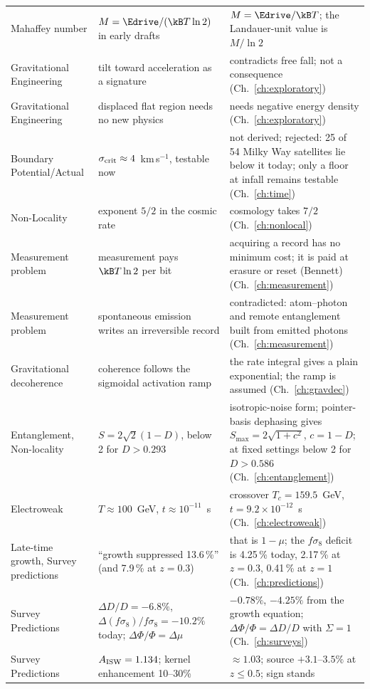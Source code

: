 {\begin{longtable}{@{}p{}p{}p{}@{}}
Mahaffey number & $M=\Edrive/(\kB T\ln2)$ in early drafts & $M=\Edrive/\kB T$; the Landauer-unit value is $M/\ln2$ \\
Gravitational Engineering & tilt toward acceleration as a signature & contradicts free fall; not a consequence (Ch.~\ref{ch:exploratory}) \\
Gravitational Engineering & displaced flat region needs no new physics & needs negative energy density (Ch.~\ref{ch:exploratory}) \\
Boundary Potential/Actual & $\sigma_{\rm crit}\approx4$~km\,s$^{-1}$, testable now & not derived; rejected: 25 of 54 Milky Way satellites lie below it today; only a floor at infall remains testable (Ch.~\ref{ch:time}) \\
Non-Locality & exponent $5/2$ in the cosmic rate & cosmology takes $7/2$ (Ch.~\ref{ch:nonlocal}) \\
Measurement problem & measurement pays $\kB T\ln2$ per bit & acquiring a record has no minimum cost; it is paid at erasure or reset (Bennett) (Ch.~\ref{ch:measurement}) \\
Measurement problem & spontaneous emission writes an irreversible record & contradicted: atom--photon and remote entanglement built from emitted photons (Ch.~\ref{ch:measurement}) \\
Gravitational decoherence & coherence follows the sigmoidal activation ramp & the rate integral gives a plain exponential; the ramp is assumed (Ch.~\ref{ch:gravdec}) \\
Entanglement, Non-locality & $S=2\sqrt2(1-D)$, below 2 for $D>0.293$ & isotropic-noise form; pointer-basis dephasing gives $S_{\max}=2\sqrt{1+c^2}$, $c=1-D$; at fixed settings below 2 for $D>0.586$ (Ch.~\ref{ch:entanglement}) \\
Electroweak & $T\approx100$~GeV, $t\approx10^{-11}$~s & crossover $T_c=159.5$~GeV, $t=9.2\times10^{-12}$~s (Ch.~\ref{ch:electroweak}) \\
Late-time growth, Survey predictions & ``growth suppressed 13.6\,\%'' (and 7.9\,\% at $z=0.3$) & that is $1-\mu$; the $f\sigma_8$ deficit is 4.25\,\% today, 2.17\,\% at $z=0.3$, 0.41\,\% at $z=1$ (Ch.~\ref{ch:predictions}) \\
Survey Predictions & $\Delta D/D=-6.8\%$, $\Delta(f\sigma_8)/f\sigma_8=-10.2\%$ today; $\Delta\Phi/\Phi=\Delta\mu$ & $-0.78\%$, $-4.25\%$ from the growth equation; $\Delta\Phi/\Phi=\Delta D/D$ with $\Sigma=1$ (Ch.~\ref{ch:surveys}) \\
Survey Predictions & $A_{\rm ISW}=1.134$; kernel enhancement 10--30\% & $\approx1.03$; source $+3.1$--$3.5\%$ at $z\le0.5$; sign stands \\

\end{longtable}}
